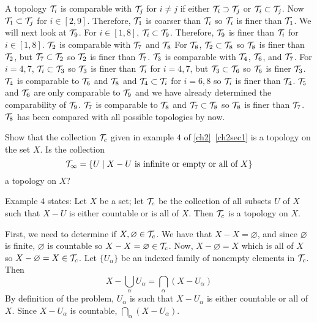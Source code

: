 \begin{exercise}
  A topology \(\mathcal{T}_i\) is comparable with \(\mathcal{T}_j\) for \(i\neq j\) if either
  \(\mathcal{T}_i\supset\mathcal{T}_j\) or \(\mathcal{T}_i\subset\mathcal{T}_j\).
  Now \(\mathcal{T}_1\subset\mathcal{T}_j\) for \(i\in[2,9]\).
  Therefore, \(\mathcal{T}_1\) is coarser than \(\mathcal{T}_i\) so \(\mathcal{T}_i\) is finer than
  \(\mathcal{T}_1\).
  We will next look at \(\mathcal{T}_9\).
  For \(i\in[1,8]\), \(\mathcal{T}_i\subset\mathcal{T}_9\).
  Therefore, \(\mathcal{T}_9\) is finer than \(\mathcal{T}_i\) for \(i\in[1,8]\).
  \(\mathcal{T}_2\) is comparable with \(\mathcal{T}_7\) and \(\mathcal{T}_8\)
  For \(\mathcal{T}_8\), \(\mathcal{T}_2\subset\mathcal{T}_8\) so \(\mathcal{T}_8\) is finer than
  \(\mathcal{T}_2\), but \(\mathcal{T}_7\subset\mathcal{T}_2\) so \(\mathcal{T}_2\) is finer than
  \(\mathcal{T}_7\).
  \(\mathcal{T}_3\) is comparable with \(\mathcal{T}_4\), \(\mathcal{T}_6\), and \(\mathcal{T}_7\).
  For \(i = 4,7\), \(\mathcal{T}_i\subset\mathcal{T}_3\) so \(\mathcal{T}_3\) is finer than
  \(\mathcal{T}_i\) for \(i = 4,7\), but \(\mathcal{T}_3\subset\mathcal{T}_6\) so \(\mathcal{T}_6\) is
  finer \(\mathcal{T}_3\).
  \(\mathcal{T}_4\) is comparable to \(\mathcal{T}_6\) and \(\mathcal{T}_8\) and
  \(\mathcal{T}_4\subset\mathcal{T}_i\) for \(i = 6,8\) so \(\mathcal{T}_i\) is finer than
  \(\mathcal{T}_4\).
  \(\mathcal{T}_5\) and \(\mathcal{T}_6\) are only comparable to \(\mathcal{T}_9\) and we have
  already determined the comparability of \(\mathcal{T}_9\).
  \(\mathcal{T}_7\) is comparable to \(\mathcal{T}_8\) and \(\mathcal{T}_7\subset\mathcal{T}_8\) so
  \(\mathcal{T}_8\) is finer than \(\mathcal{T}_7\).
  \(\mathcal{T}_8\) has been compared with all possible topologies by now.
\item
  Show that the collection \(\mathcal{T}_c\) given in example \(4\) of
  \cref{ch2}~\cref{ch2sec1} is a topology on the set \(X\).
  Is the collection
  \[
  \mathcal{T}_{\infty} =
  \{U\mid X - U\text{ is infinite or empty or all of } X\}
  \]
  a topology on \(X\)?
  \par\smallskip
  Example \(4\) states: Let \(X\) be a set; let \(\mathcal{T}_c\) be the collection of
  all subsets \(U\) of \(X\) such that \(X - U\) is either countable or is all
  of \(X\).
  Then \(\mathcal{T}_c\) is a topology on \(X\).
  \par\smallskip
  First, we need to determine if \(X,\varnothing\in\mathcal{T}_c\).
  We have that \(X - X = \varnothing\), and since \(\varnothing\) is finite,
  \(\varnothing\) is countable so \(X - X = \varnothing\in\mathcal{T}_c\).
  Now, \(X - \varnothing = X\) which is all of \(X\) so
  \(X - \varnothing = X\in\mathcal{T}_c\).
  Let \(\{U_{\alpha}\}\) be an indexed family of nonempty elements in
  \(\mathcal{T}_c\).
  Then
  \[
  X - \bigcup_{\alpha}U_{\alpha} = \bigcap_{\alpha}(X - U_{\alpha})
  \]
  By definition of the problem, \(U_{\alpha}\) is such that \(X - U_{\alpha}\)
  is either countable or all of \(X\).
  Since \(X - U_{\alpha}\) is countable, \(\bigcap_{\alpha}(X - U_{\alpha})\).

\end{exercise}
